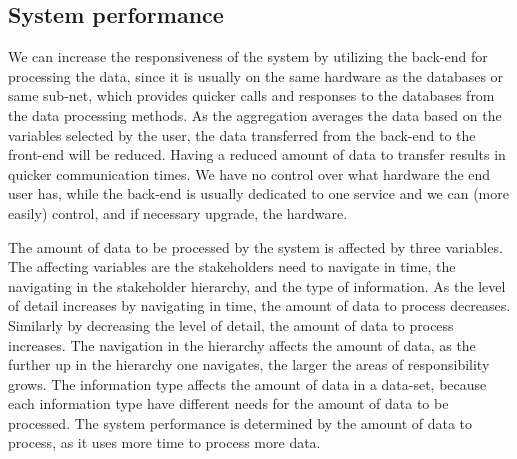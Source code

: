 \subsection{System performance} %
\label{sub:system_performance}
We can increase the responsiveness of the system by utilizing the back-end for 
processing the data, since it is usually on the same hardware as the databases or 
same sub-net, which provides quicker calls and responses to the databases from 
the data processing methods. As the aggregation averages the data based on the 
variables selected by the user, the data transferred from the back-end to the 
front-end will be reduced. Having a reduced amount of data to transfer results 
in quicker communication times. We 
have no control over what hardware the end user has, while the back-end 
is usually dedicated to one service and we can (more easily) control, and if 
necessary upgrade, the hardware.

The amount of data to be processed by the system is affected by three 
variables. The affecting variables are the stakeholders need to navigate in 
time, the navigating in the stakeholder hierarchy, and the type of information.
As the level of detail increases by navigating in time, the amount of data to 
process decreases. Similarly by decreasing the level of detail, the amount of 
data to process increases. The navigation in the hierarchy affects the amount 
of data, as the further up in the hierarchy one navigates, the larger the 
areas of responsibility grows. The information type affects the amount of data 
in a data-set, because each information type have different needs for the 
amount of data to be processed. The system performance is determined by the 
amount of data to process, as it uses more time to process more data. 



